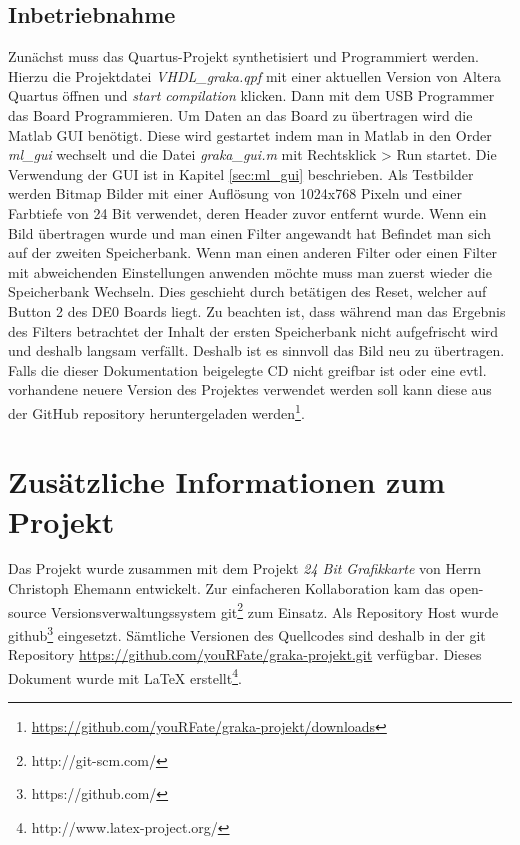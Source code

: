 \documentclass[%
  paper=A4, %
  pagesize, %
  12pt,
  ngerman   %
]{scrreprt}  %
\begin{document}
\section{Inbetriebnahme}
Zunächst muss das Quartus-Projekt synthetisiert und Programmiert werden. Hierzu die Projektdatei \emph{VHDL\_graka.qpf} mit einer aktuellen Version von Altera Quartus öffnen und \emph{start compilation} klicken. Dann mit dem USB Programmer das Board Programmieren. Um Daten an das Board zu übertragen wird die Matlab GUI benötigt. Diese wird gestartet indem man in Matlab in den Order \emph{ml\_gui} wechselt und die Datei \emph{graka\_gui.m} mit Rechtsklick > Run startet. Die Verwendung der GUI ist in Kapitel \ref{sec:ml_gui} beschrieben. Als Testbilder werden Bitmap Bilder mit einer Auflösung von 1024x768 Pixeln und einer Farbtiefe von 24 Bit verwendet, deren Header zuvor entfernt wurde. Wenn ein Bild übertragen wurde und man einen Filter angewandt hat Befindet man sich auf der zweiten Speicherbank. Wenn man einen anderen Filter oder einen Filter mit abweichenden Einstellungen anwenden möchte muss man zuerst wieder die Speicherbank Wechseln. Dies geschieht durch betätigen des Reset, welcher auf Button 2 des DE0 Boards liegt. Zu beachten ist, dass während man das Ergebnis des Filters betrachtet der Inhalt der ersten Speicherbank nicht aufgefrischt wird und deshalb langsam verfällt. Deshalb ist es sinnvoll das Bild neu zu übertragen.\\Falls die dieser Dokumentation beigelegte CD nicht greifbar ist oder eine evtl. vorhandene neuere Version des Projektes verwendet werden soll kann diese aus der GitHub repository heruntergeladen werden\footnote{\url{https://github.com/youRFate/graka-projekt/downloads}}. 

\chapter{Zusätzliche Informationen zum Projekt}
Das Projekt wurde zusammen mit dem Projekt \emph{24 Bit Grafikkarte} von Herrn Christoph Ehemann entwickelt. Zur einfacheren Kollaboration kam das open-source Versionsverwaltungssystem git\footnote{http://git-scm.com/} zum Einsatz. Als Repository Host wurde github\footnote{https://github.com/} eingesetzt. Sämtliche Versionen des Quellcodes sind deshalb in der git Repository \url{https://github.com/youRFate/graka-projekt.git} verfügbar. Dieses Dokument wurde mit \LaTeX{} erstellt\footnote{http://www.latex-project.org/}.
\end{document}
